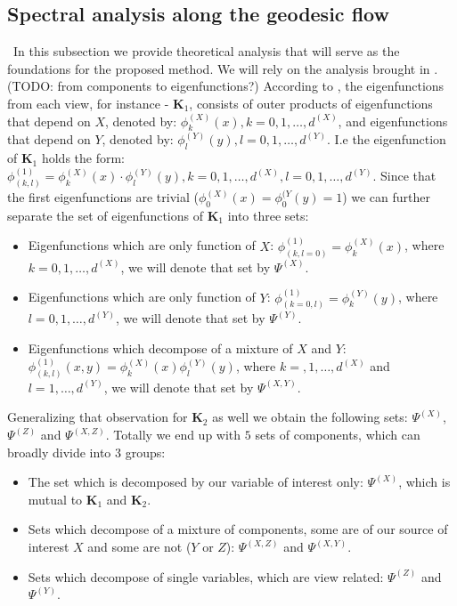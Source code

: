 \documentclass[]{article}
\theoremstyle{definition}
\begin{document}
	\subsection{Spectral analysis along the geodesic flow}\	
	In this subsection we provide theoretical analysis that will serve as the foundations for the proposed method.
	We will rely on the analysis brought in \cite{singer2006spectral}. 
	(TODO: from components to eigenfunctions?)
	According to \cite[equation 3.11]{singer2006spectral}, the eigenfunctions from each view, for instance - $\mathbf{K}_1$, consists of outer products of eigenfunctions that depend on $X$, denoted by: $\phi^{(X)}_k(x), k=0,1,\ldots,d^{(X)}$, and eigenfunctions that depend on $Y$, denoted by: $\phi^{(Y)}_l(y), l=0,1,\ldots,d^{(Y)}$. I.e the eigenfunction of $\mathbf{K}_1$ holds the form:
	$\phi^{(1)}_{(k,l)} = \phi^{(X)}_k(x) \cdot \phi^{(Y)}_l(y), k=0,1,\ldots,d^{(X)}, l=0,1,\ldots,d^{(Y)}$.
	Since that the first eigenfunctions are trivial ($\phi^{(X)}_0(x)=\phi^{(Y}_0(y) = 1$) we can further separate the set of eigenfunctions of $\mathbf{K}_1$ into three sets:
	\begin{itemize}
		\item Eigenfunctions which are only function of $X$: $\phi^{(1)}_{(k,l=0)} = \phi^{(X)}_k(x)$, where $k=0,1,\ldots,d^{(X)}$, we will denote that set by $\Psi^{(X)}$.
		\item Eigenfunctions which are only function of $Y$: $\phi^{(1)}_{(k=0,l)} = \phi^{(Y)}_k(y)$, where $l=0,1,\ldots,d^{(Y)}$,
		we will denote that set by $\Psi^{(Y)}$.
		\item Eigenfunctions which decompose of a mixture of $X$ and $Y$: $\phi^{(1)}_{(k,l)}(x,y) = \phi^{(X)}_k(x) \phi^{(Y)}_l(y)$, where $k=,1,\ldots,d^{(X)}$ and  $l=1,\ldots,d^{(Y)}$, we will denote that set by $\Psi^{(X,Y)}$.
	\end{itemize}
	Generalizing that observation for $\mathbf{K}_2$ as well we obtain the following sets: $\Psi^{(X)}$, $\Psi^{(Z)}$ and $\Psi^{(X,Z)}$.
	Totally we end up with $5$ sets of components, which can broadly divide into $3$ groups:
	\begin{itemize}
		\item The set which is decomposed by our variable of interest only: $\Psi^{(X)}$, which is mutual to $\mathbf{K}_1$ and $\mathbf{K}_2$.
		\item Sets which decompose of a mixture of components, some are of our source of interest $X$ and some are not ($Y$ or $Z$): $\Psi^{(X,Z)}$ and $\Psi^{(X,Y)}$.
		\item Sets which decompose of single variables, which are view related: $\Psi^{(Z)}$ and $\Psi^{(Y)}$.
	\end{itemize}
\end{document}
